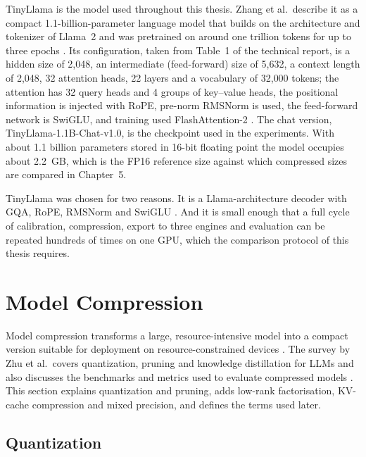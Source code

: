 TinyLlama is the model used throughout this thesis. Zhang et al.\ describe it as a compact 1.1-billion-parameter language model that builds on the architecture and tokenizer of Llama~2 and was pretrained on around one trillion tokens for up to three epochs \cite{zhang2024tinyllama}. Its configuration, taken from Table~1 of the technical report, is a hidden size of 2{,}048, an intermediate (feed-forward) size of 5{,}632, a context length of 2{,}048, 32 attention heads, 22 layers and a vocabulary of 32{,}000 tokens; the attention has 32 query heads and 4 groups of key--value heads, the positional information is injected with RoPE, pre-norm RMSNorm is used, the feed-forward network is SwiGLU, and training used FlashAttention-2 \cite{zhang2024tinyllama}. The chat version, TinyLlama-1.1B-Chat-v1.0, is the checkpoint used in the experiments. With about 1.1 billion parameters stored in 16-bit floating point the model occupies about 2.2~GB, which is the FP16 reference size against which compressed sizes are compared in Chapter~5.

TinyLlama was chosen for two reasons. It is a Llama-architecture decoder with GQA, RoPE, RMSNorm and SwiGLU \cite{zhang2024tinyllama}. And it is small enough that a full cycle of calibration, compression, export to three engines and evaluation can be repeated hundreds of times on one GPU, which the comparison protocol of this thesis requires.

\section{Model Compression}
\label{sec:ch2-compression}

Model compression transforms a large, resource-intensive model into a compact version suitable for deployment on resource-constrained devices \cite{zhu2024survey}. The survey by Zhu et al.\ covers quantization, pruning and knowledge distillation for LLMs and also discusses the benchmarks and metrics used to evaluate compressed models \cite{zhu2024survey}. This section explains quantization and pruning, adds low-rank factorisation, KV-cache compression and mixed precision, and defines the terms used later.

\subsection{Quantization}
\label{sec:ch2-quant}

